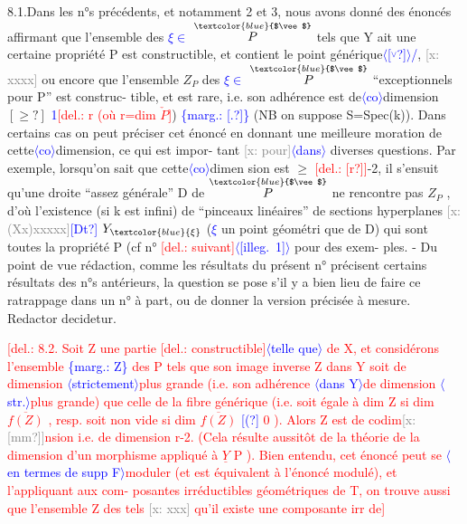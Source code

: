 \documentclass[11pt]{article}
\newcommand{\mspage}[1]{{\small\sffamily[p.\,#1]}}
\newcommand{\hand}[1]{\textcolor{blue}{#1}}
\let\over\relax
\newcommand{\over}[2]{\textcolor{gray}{#1}\textcolor{blue}{\ensuremath{^{\!\nearrow}}#2}}
\newcommand{\inserted}[2][]{\textcolor{blue}{$\langle$#2$\rangle$}}
\newcommand{\margin}[1]{\textcolor{blue}{\{\textsf{marg.:} #1\}}}
\newcommand{\deleted}[1]{\textcolor{red}{[\textsf{del.:} #1]}}
\newcommand{\xout}[1]{\textcolor{gray}{[\textsf{x:} #1]}}
\newcommand{\unsure}[1]{[#1?]}
\newcommand{\illegible}[1]{[\textsf{illeg.\ #1}]}
\begin{document}
8.1.Dans les n°s précédents, et notamment 2 et 3, nous avons donné des
énoncés affirmant que l'ensemble des \hand{$\xi\in$} $\overset{\hand{$\vee$}}{P}$ tels que Y ait une certaine
propriété P est constructible, et contient le point générique\inserted{\unsure{$\overset{\vee}{\ }$}}\hand{/}, \xout{xxxx} ou
encore que l'ensemble $Z_P$ des \hand{$\xi\in$} $\overset{\hand{$\vee$}}{P}$ ``exceptionnels pour P'' est construc-%
tible, et est rare, i.e. son adhérence est de\inserted{co}dimension $\unsure{\geq}$ \hand{1}\deleted{r (où r=dim $\check{P}$}) \margin{\unsure{.}}
(NB on suppose S=Spec(k)). Dans certains cas on peut préciser cet énoncé
en donnant une meilleure m\over{aj}{\unsure{in}}oration de cette\inserted{co}dimension, ce qui est impor-%
tant \xout{pour}\inserted[typed]{dans} diverses questions. Par exemple, lorsqu'on sait que cette\inserted{co}dimen
sion est $\geq$ \deleted{\unsure{r}}-2, il s'ensuit qu'une droite ``assez générale'' D de $\overset{\hand{$\vee$}}{P}$
ne rencontre pas $Z_P$ , d'où l'existence (si k est infini) de ``pinceaux
linéaires'' de sections hyperplanes \xout{(Xx)xxxxx}\hand{\unsure{Dt}} $Y_{\hand{\xi}}$ (\hand{$\xi$} un point géométri
que de D) qui sont toutes la propriété P (cf n° \deleted{suivant}\inserted{\illegible{1}} pour des exem-%
ples. - Du point de vue rédaction, comme les résultats du présent n°
précisent certains résultats des n°s antérieurs, la question se pose s'il
y a bien lieu de faire ce ratrappage dans un n° à part, ou de donner la
version précisée à mesure. Redactor decidetur.

\deleted{8.2. Soit Z une partie \deleted{constructible}\inserted{telle que} de X, et considérons l'ensemble \margin{Z}
des \quad P tels que son image inverse Z dans Y soit de dimension
\inserted[typed]{strictement}plus grande (i.e. son adhérence \inserted[typed]{dans Y}de dimension \inserted[typed]{str.}plus grande) que celle de
la fibre générique (i.e. soit égale à dim Z si dim $\overline{f(Z)}$ \quad 0, resp.
soit non vide si dim $\overline{f(Z)}$ \hand{\unsure{(}} 0 ). Alors Z est de codim\xout{\unsure{mm}}nsion \quad 2 i.e.
de dimension \quad r-2. (Cela résulte aussitôt de la théorie de la dimension
d'un morphisme appliqué à $\underline{Y}$ \quad P ). Bien entendu, cet énoncé peut se
\inserted[typed]{en termes de supp F}moduler (et est équivalent à l'énoncé modulé), et l'appliquant aux com-%
posantes irréductibles géométriques de T, on trouve aussi que l'ensemble
Z des \quad tels \xout{xxx} qu'il existe une composante irr de}

\mspage{31}
\end{document}
